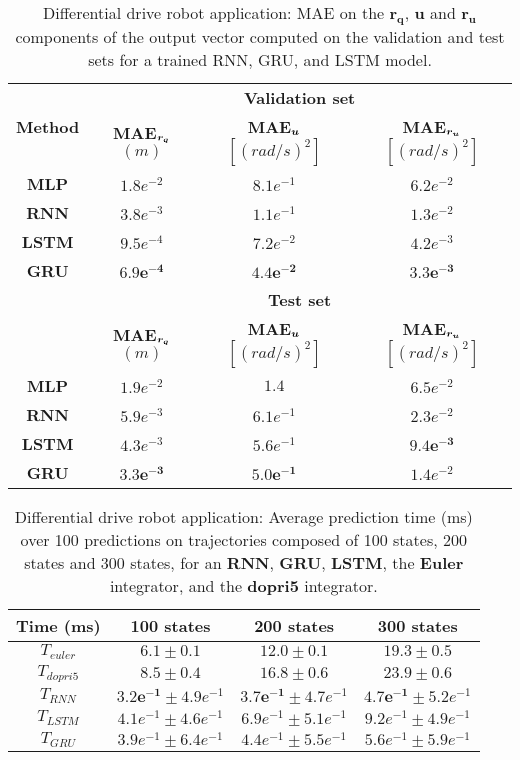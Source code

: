 \begin{table}[h!]
\centering
\begin{tabular}{ | c | c  c  c | }
\hline
    \multirow{2}{*}{\textbf{Method}} & \multicolumn{3}{c|}{\textbf{Validation set}} \\ \cline{2-4}
    & \textbf{MAE$_{\boldsymbol{r_q}}$} $(m)$  & \textbf{MAE$_{\boldsymbol{u}}$} $[(rad/s)^2]$ & \textbf{MAE$_{\boldsymbol{r_u}}$} $[(rad/s)^2]$ \\ \hline
{\textbf{MLP}} & $1.8e^{-2}$ & $8.1e^{-1}$ & $6.2e^{-2}$ \\ 
{\textbf{RNN}} & $3.8e^{-3}$ & $1.1e^{-1}$ & $1.3e^{-2}$ \\ 
{\textbf{LSTM}} & $9.5e^{-4}$ & $7.2e^{-2}$ & $4.2e^{-3}$ \\ 
{\textbf{GRU}} & $\boldsymbol{6.9e^{-4}}$ & $\boldsymbol{4.4e^{-2}}$ & $\boldsymbol{3.3e^{-3}}$ \\ 
\hline
    & \multicolumn{3}{c|}{\textbf{Test set}}\\ \cline{2-4}
    & \textbf{MAE$_{\boldsymbol{r_q}}$} $(m)$  & \textbf{MAE$_{\boldsymbol{u}}$} $[(rad/s)^2]$ & \textbf{MAE$_{\boldsymbol{r_u}}$} $[(rad/s)^2]$ \\ \hline
{\textbf{MLP}} & $1.9e^{-2}$ & $1.4$ & $6.5e^{-2}$ \\ 
{\textbf{RNN}} &  $5.9e^{-3}$ & $6.1e^{-1}$ & $2.3e^{-2}$ \\ 
{\textbf{LSTM}} & $4.3e^{-3}$ & $5.6e^{-1}$ & $\boldsymbol{9.4e^{-3}}$ \\ 
{\textbf{GRU}} & $\boldsymbol{3.3e^{-3}}$ & $5\boldsymbol{.0e^{-1}}$ & $1.4e^{-2}$ \\ 
\hline
\end{tabular}
\caption{
    Differential drive robot application: MAE on the $\boldsymbol{r_q}$, $\boldsymbol{u}$ and $\boldsymbol{r_u}$ components of the output vector computed on the validation and test sets for a trained RNN, GRU, and LSTM model.}
    \label{tab:NN_results_table_Q_unic}
\end{table}

\begin{table}[t]
\centering
\begin{tabular}{ | c | c  c  c | }
\hline
    \textbf{Time (ms)} & 100 states  & 200 states & 300 states \\ \hline
    $T_{euler}$ & $6.1 \pm 0.1$ & $12.0 \pm 0.1$ & $19.3 \pm 0.5$ \\ 
$T_{dopri5}$ & $8.5 \pm 0.4$ & $16.8 \pm 0.6$ & $23.9 \pm 0.6$ \\ 
$T_{RNN}$ & $\boldsymbol{3.2e^{-1}} \pm 4.9e^{-1}$ & $\boldsymbol{3.7e^{-1}} \pm 4.7e^{-1}$ & $\boldsymbol{4.7e^{-1}} \pm 5.2e^{-1}$ \\ 
$T_{LSTM}$ & $4.1e^{-1} \pm 4.6e^{-1}$ & $6.9e^{-1} \pm 5.1e^{-1}$ & $9.2e^{-1} \pm 4.9e^{-1}$ \\ 
$T_{GRU}$ & $3.9e^{-1} \pm 6.4e^{-1}$ & $4.4e^{-1} \pm 5.5e^{-1}$ & $5.6e^{-1} \pm 5.9e^{-1}$  \\ \hline
\end{tabular}
\caption{
    Differential drive robot application: Average prediction time (ms) over 100 predictions on trajectories composed of 100 states, 200 states and 300 states, for an \textbf{RNN}, \textbf{GRU}, \textbf{LSTM}, the \textbf{Euler} integrator, and the \textbf{dopri5} integrator.}
    \label{tab:timepred_unic}
\end{table}